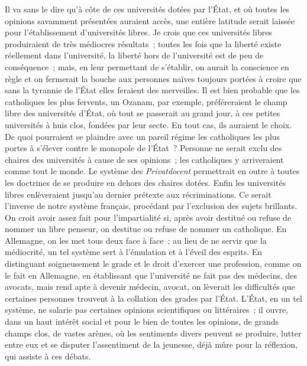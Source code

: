 \documentclass[french,twoside]{book} %
\begin{document}
Il va sans le dire qu’à côte de ces universités dotées par l’État, et où toutes les opinions savamment présentées auraient accès, une entière latitude serait laissée pour l’établissement d’universités libres. Je crois que ces universités libres produiraient de très médiocres résultats ; toutes les fois que la liberté existe réellement dans l’université, la liberté hors de l’université est de peu de conséquence ; mais, en leur permettant de s’établir, on aurait la conscience en règle et on fermerait la bouche aux personnes naïves toujours portées à croire que sans la tyrannie de l’État elles feraient des merveilles. Il est bien probable que les catholiques les plus fervents, un Ozanam, par exemple, préféreraient le champ libre des universités d’État, où tout se passerait au grand jour, à ces petites universités à huis clos, fondées par leur secte. En tout cas, ils auraient le choix. De quoi pourraient se plaindre avec un pareil régime les catholiques les plus portes à s’élever contre le monopole de l’État ? Personne ne serait exclu des chaires des universités à cause de ses opinions ; les catholiques y arriveraient comme tout le monde. Le système des {\itshape Privatdocent} permettrait en outre à toutes les doctrines de se produire en dehors des chaires dotées. Enfin les universités libres enlèveraient jusqu’au dernier prétexte aux récriminations. Ce serait l’inverse de notre système français, procédant par l’exclusion des sujets brillants. On croit avoir assez fait pour l’impartialité si, après avoir destitué ou refuse de nommer un libre penseur, on destitue ou refuse de nommer un catholique. En Allemagne, on les met tous deux face à face ; au lieu de ne servir que la médiocrité, un tel système sert à l’émulation et à l’éveil des esprits. En distinguant soigneusement le grade et le droit d’exercer une profession, comme on le fait en Allemagne, en établissant que l’université ne fait pas des médecins, des avocats, mais rend apte à devenir médecin, avocat, on lèverait les difficultés que certaines personnes trouvent à la collation des grades par l’État. L’État, en un tel système, ne salarie pas certaines opinions scientifiques ou littéraires ; il ouvre, dans un haut intérêt social et pour le bien de toutes les opinions, de grands champs clos, de vastes arènes, où les sentiments divers peuvent se produire, lutter entre eux et se disputer l’assentiment de la jeunesse, déjà mûre pour la réflexion, qui assiste à ces débats.\par
\end{document}
